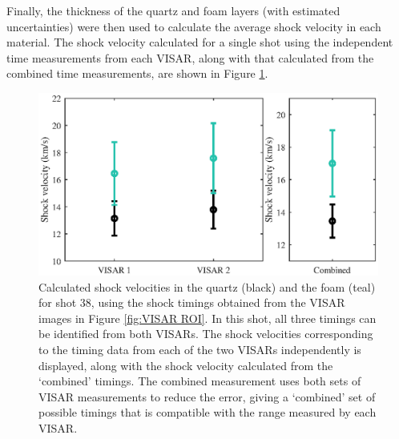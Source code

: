 Finally, the thickness of the quartz and foam layers (with estimated uncertainties) were then used to calculate the average shock velocity in each material. The shock velocity calculated for a single shot using the independent time measurements from each VISAR, along with that calculated from the combined time measurements, are shown in Figure \ref{fig:VISAR Timing}.

\begin{figure} [h]
\begin{centering}
\includegraphics[width=1.0\textwidth]{figures/Experiment/VISARTiming.eps}%
\caption{\label{fig:VISAR Timing} Calculated shock velocities in the quartz (black) and the foam (teal)  for shot 38, using the shock timings obtained from the VISAR images in Figure \ref{fig:VISAR ROI}. In this shot, all three timings can be identified from both VISARs. The shock velocities corresponding to the timing data from each of the two VISARs independently is displayed, along with the shock velocity calculated from the `combined' timings. The combined measurement uses both sets of VISAR measurements to reduce the error, giving a `combined' set of possible timings that is compatible with the range measured by each VISAR.}
\end{centering}
\end{figure}



